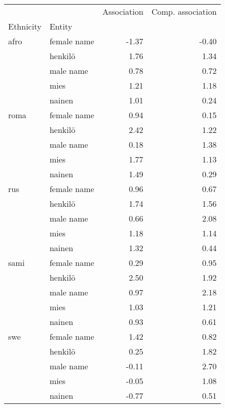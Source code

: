 \begin{tabular}{llrr}
\toprule
    &        &  Association &  Comp. association \\
Ethnicity & Entity &              &                    \\
\midrule
afro & female name &        -1.37 &              -0.40 \\
    & henkilö &         1.76 &               1.34 \\
    & male name &         0.78 &               0.72 \\
    & mies &         1.21 &               1.18 \\
    & nainen &         1.01 &               0.24 \\
roma & female name &         0.94 &               0.15 \\
    & henkilö &         2.42 &               1.22 \\
    & male name &         0.18 &               1.38 \\
    & mies &         1.77 &               1.13 \\
    & nainen &         1.49 &               0.29 \\
rus & female name &         0.96 &               0.67 \\
    & henkilö &         1.74 &               1.56 \\
    & male name &         0.66 &               2.08 \\
    & mies &         1.18 &               1.14 \\
    & nainen &         1.32 &               0.44 \\
sami & female name &         0.29 &               0.95 \\
    & henkilö &         2.50 &               1.92 \\
    & male name &         0.97 &               2.18 \\
    & mies &         1.03 &               1.21 \\
    & nainen &         0.93 &               0.61 \\
swe & female name &         1.42 &               0.82 \\
    & henkilö &         0.25 &               1.82 \\
    & male name &        -0.11 &               2.70 \\
    & mies &        -0.05 &               1.08 \\
    & nainen &        -0.77 &               0.51 \\
\bottomrule
\end{tabular}
